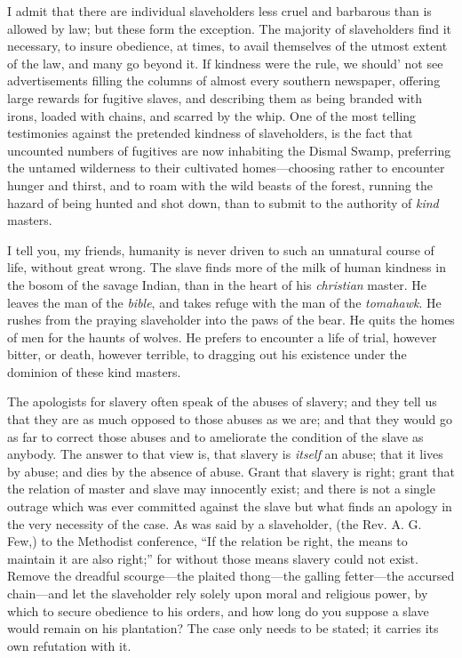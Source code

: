 I admit that there are individual slaveholders less cruel and barbarous
than is allowed by law; but these form the exception. The majority of
slaveholders find it necessary, to insure obedience, at times, to avail
themselves of the utmost extent of the law, and many go beyond it. If
kindness were the rule, we should' not see advertisements filling the
columns of almost every southern newspaper, offering large rewards for
fugitive slaves, and describing them as being branded with irons, loaded
with chains, and scarred by the whip. One of the most telling
testimonies against the pretended kindness of slaveholders, is the fact
that uncounted numbers of fugitives are now inhabiting the Dismal Swamp,
preferring the {}untamed wilderness to their cultivated homes---choosing
rather to encounter hunger and thirst, and to roam with the wild beasts
of the forest, running the hazard of being hunted and shot down, than to
submit to the authority of \emph{kind} masters.

I tell you, my friends, humanity is never driven to such an unnatural
course of life, without great wrong. The slave finds more of the milk of
human kindness in the bosom of the savage Indian, than in the heart of
his \emph{christian} master. He leaves the man of the \emph{bible}, and
takes refuge with the man of the \emph{tomahawk}. He rushes from the
praying slaveholder into the paws of the bear. He quits the homes of men
for the haunts of wolves. He prefers to encounter a life of trial,
however bitter, or death, however terrible, to dragging out his
existence under the dominion of these kind masters.

The apologists for slavery often speak of the abuses of slavery; and
they tell us that they are as much opposed to those abuses as we are;
and that they would go as far to correct those abuses and to ameliorate
the condition of the slave as anybody. The answer to that view is, that
slavery is \emph{itself} an abuse; that it lives by abuse; and dies by
the absence of abuse. Grant that slavery is right; grant that the
relation of master and slave may innocently exist; and there is not a
single outrage which was ever committed against the slave but what finds
an apology in the very necessity of the case. As was said by a
slaveholder, (the Rev. A. G. Few,) to the Methodist conference, ``If the
relation be right, the means to maintain it are also right;'' for
without those means slavery could not exist. Remove the dreadful
scourge---the plaited thong---the galling fetter---the accursed
chain---and let the slaveholder rely solely upon moral and religious
power, by which to secure obedience to his orders, and how long do you
suppose a slave would remain on his plantation? The case only needs to
be stated; it carries its own refutation with it.

